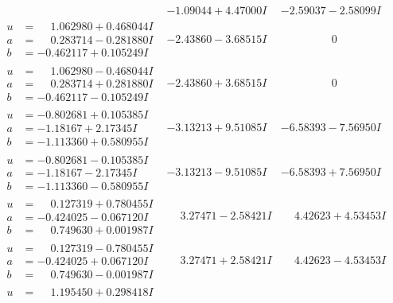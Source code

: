 \documentclass[1p]{elsarticle_modified}
\theoremstyle{definition}
\begin{document}
$$\begin{array}{c|c|c}
 & -1.09044 + 4.47000 I & -2.59037 - 2.58099 I \\ \hline\begin{aligned}
u &= \phantom{-}1.062980 + 0.468044 I \\
a &= \phantom{-}0.283714 - 0.281880 I \\
b &= -0.462117 + 0.105249 I\end{aligned}
 & -2.43860 - 3.68515 I & \phantom{-0.000000 } 0 \\ \hline\begin{aligned}
u &= \phantom{-}1.062980 - 0.468044 I \\
a &= \phantom{-}0.283714 + 0.281880 I \\
b &= -0.462117 - 0.105249 I\end{aligned}
 & -2.43860 + 3.68515 I & \phantom{-0.000000 } 0 \\ \hline\begin{aligned}
u &= -0.802681 + 0.105385 I \\
a &= -1.18167 + 2.17345 I \\
b &= -1.113360 + 0.580955 I\end{aligned}
 & -3.13213 + 9.51085 I & -6.58393 - 7.56950 I \\ \hline\begin{aligned}
u &= -0.802681 - 0.105385 I \\
a &= -1.18167 - 2.17345 I \\
b &= -1.113360 - 0.580955 I\end{aligned}
 & -3.13213 - 9.51085 I & -6.58393 + 7.56950 I \\ \hline\begin{aligned}
u &= \phantom{-}0.127319 + 0.780455 I \\
a &= -0.424025 - 0.067120 I \\
b &= \phantom{-}0.749630 + 0.001987 I\end{aligned}
 & \phantom{-}3.27471 - 2.58421 I & \phantom{-}4.42623 + 4.53453 I \\ \hline\begin{aligned}
u &= \phantom{-}0.127319 - 0.780455 I \\
a &= -0.424025 + 0.067120 I \\
b &= \phantom{-}0.749630 - 0.001987 I\end{aligned}
 & \phantom{-}3.27471 + 2.58421 I & \phantom{-}4.42623 - 4.53453 I \\ \hline\begin{aligned}
u &= \phantom{-}1.195450 + 0.298418 I \\

\end{aligned}
\end{array}$$
\end{document}
